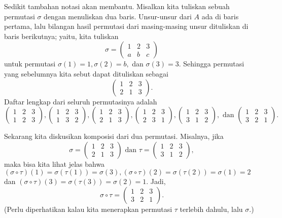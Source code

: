 Sedikit tambahan notasi akan membantu. Misalkan kita tuliskan sebuah permutasi $\sigma$ dengan menuliskan dua baris. Unsur-unsur dari $A$ ada di baris pertama, lalu bilangan hasil permutasi dari masing-masing unsur dituliskan di baris berikutnya; yaitu, kita tuliskan 
\[ \sigma = \begin{pmatrix}
1 & 2 & 3 \\
a & b & c
\end{pmatrix}
\]
untuk permutasi $\sigma(1) = 1, \sigma(2) = b,$ dan $\sigma(3) = 3$. Sehingga permutasi yang sebelumnya kita sebut dapat dituliskan sebagai
\[\begin{pmatrix}
1 & 2 & 3 \\
2 & 1 & 3
\end{pmatrix}.
\]
Daftar lengkap dari seluruh permutasinya adalah
\[\begin{pmatrix}
1 & 2 & 3 \\
1 & 2 & 3
\end{pmatrix},
\begin{pmatrix}
1 & 2 & 3 \\
1 & 3 & 2
\end{pmatrix},
\begin{pmatrix}
1 & 2 & 3 \\
2 & 1 & 3
\end{pmatrix},
\begin{pmatrix}
1 & 2 & 3 \\
2 & 3 & 1
\end{pmatrix},
\begin{pmatrix}
1 & 2 & 3 \\
3 & 1 & 2
\end{pmatrix}, \text{ dan }
\begin{pmatrix}
1 & 2 & 3 \\
3 & 2 & 1
\end{pmatrix}.
\]

Sekarang kita diskusikan komposisi dari dua permutasi. Misalnya, jika 
\[ \sigma = \begin{pmatrix}
1 & 2 & 3 \\
2 & 1 & 3
\end{pmatrix} \text{ dan }
\tau = \begin{pmatrix}
1 & 2 & 3 \\
3 & 1 & 2
\end{pmatrix},
\]
maka bisa kita lihat jelas bahwa $(\sigma \circ \tau)(1) = \sigma(\tau(1)) = \sigma(3), (\sigma \circ \tau)(2) = \sigma(\tau(2)) = \sigma(1) = 2$ dan $(\sigma \circ \tau)(3) = \sigma(\tau(3)) = \sigma(2) = 1$. Jadi,
\[\sigma \circ \tau = \begin{pmatrix}
1 & 2 & 3 \\
3 & 2 & 1
\end{pmatrix}.
\]
(Perlu diperhatikan kalau kita menerapkan permutasi $\tau$ terlebih dahulu, lalu $\sigma$.)

